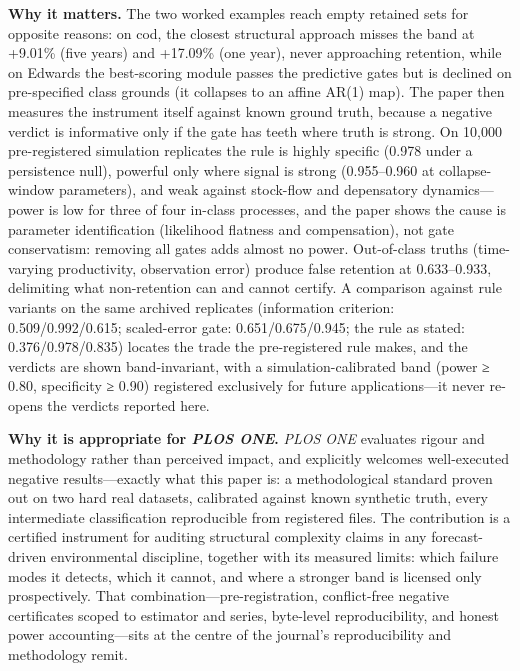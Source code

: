 \documentclass[11pt]{article}
\begin{document}
\textbf{Why it matters.} The two worked examples reach empty retained
sets for opposite reasons: on cod, the closest structural approach
misses the band at +9.01\% (five years) and +17.09\% (one year), never
approaching retention, while on Edwards the best-scoring module passes
the predictive gates but is declined on pre-specified class grounds (it
collapses to an affine AR(1) map). The paper then measures the
instrument itself against known ground truth, because a negative verdict
is informative only if the gate has teeth where truth is strong. On
10,000 pre-registered simulation replicates the rule is highly specific
(0.978 under a persistence null), powerful only where signal is strong
(0.955--0.960 at collapse-window parameters), and weak against
stock-flow and depensatory dynamics---power is low for three of four
in-class processes, and the paper shows the cause is parameter
identification (likelihood flatness and compensation), not gate
conservatism: removing all gates adds almost no power. Out-of-class
truths (time-varying productivity, observation error) produce false
retention at 0.633--0.933, delimiting what non-retention can and cannot
certify. A comparison against rule variants on the same archived
replicates (information criterion: 0.509/0.992/0.615; scaled-error gate:
0.651/0.675/0.945; the rule as stated: 0.376/0.978/0.835) locates the
trade the pre-registered rule makes, and the verdicts are shown
band-invariant, with a simulation-calibrated band (power ≥ 0.80,
specificity ≥ 0.90) registered exclusively for future applications---it
never re-opens the verdicts reported here.

\textbf{Why it is appropriate for \emph{PLOS ONE}.} \emph{PLOS ONE}
evaluates rigour and methodology rather than perceived impact, and
explicitly welcomes well-executed negative results---exactly what this
paper is: a methodological standard proven out on two hard real
datasets, calibrated against known synthetic truth, every intermediate
classification reproducible from registered files. The contribution is a
certified instrument for auditing structural complexity claims in any
forecast-driven environmental discipline, together with its measured
limits: which failure modes it detects, which it cannot, and where a
stronger band is licensed only prospectively. That
combination---pre-registration, conflict-free negative certificates
scoped to estimator and series, byte-level reproducibility, and honest
power accounting---sits at the centre of the journal's reproducibility
and methodology remit.
\end{document}
